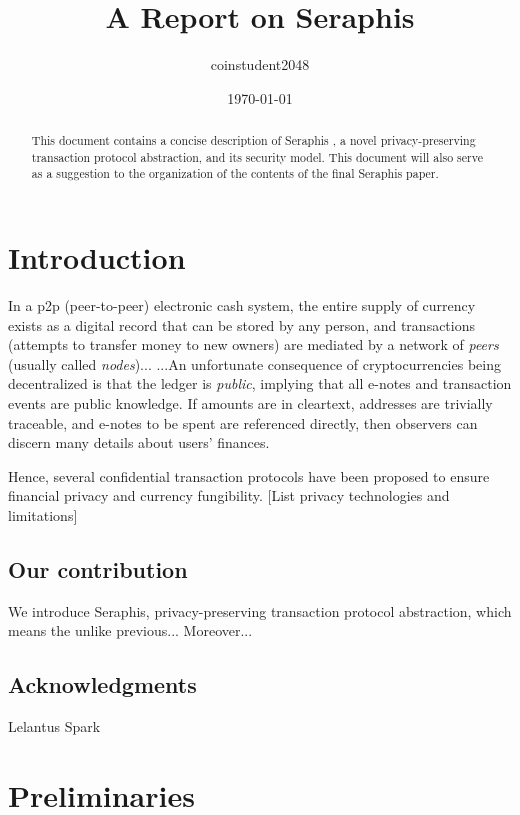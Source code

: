 \documentclass{article}
\title{A Report on Seraphis}
\author{coinstudent2048}
\date{\today}
\begin{document}
\maketitle

\begin{abstract}
This document contains a concise description of Seraphis \cite{seraphis}, a novel privacy-preserving transaction protocol abstraction, and its security model. This document will also serve as a suggestion to the organization of the contents of the final Seraphis paper.
\end{abstract}

\section{Introduction}
In a p2p (peer-to-peer) electronic cash system, the entire supply of currency exists as a digital record that can be stored by any person, and transactions (attempts to transfer money to new owners) are mediated by a network of \textit{peers} (usually called \textit{nodes})... ...An unfortunate consequence of cryptocurrencies being decentralized is that the ledger is \textit{public}, implying that all e-notes and transaction events are public knowledge. If amounts are in cleartext, addresses are trivially traceable, and e-notes to be spent are referenced directly, then observers can discern many details about users’ finances.

Hence, several confidential transaction protocols have been proposed to ensure financial privacy and currency fungibility. [List privacy technologies and limitations]
\subsection{Our contribution}
We introduce Seraphis, privacy-preserving transaction protocol abstraction, which means the unlike previous... Moreover...
\subsection{Acknowledgments}
Lelantus Spark

\section{Preliminaries}
\end{document}
